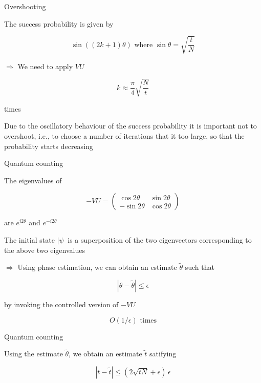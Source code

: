 
\begin{frame}{Overshooting}

The success probability is given by

\[
\sin((2k + 1)\theta) \mbox{ where } \sin\theta = \sqrt{\frac{t}{N}}
\]

\bigskip
$\Rightarrow$ We need to apply $VU$

\[
k \approx \frac{\pi}{4} \sqrt{\frac{N}{t}}
\]

times

\bigskip
Due to the oscillatory behaviour of the success probability it is important not to overshoot, i.e., to choose a number of iterations that it too large, so that the probability starts decreasing
\end{frame}


\begin{frame}{Quantum counting}

The eigenvalues of 

\[
- V U = \begin{pmatrix} \cos2\theta   & \sin2\theta \\
                              - \sin2\theta & \cos2\theta
              \end{pmatrix}
\]


are $e^{i 2\theta}$ and $e^{-i 2\theta}$

\bigskip
The initial state $|\psi\>$ is a superposition of the two eigenvectors corresponding to the above two eigenvalues

\bigskip
$\Rightarrow$ Using phase estimation, we can obtain an estimate $\tilde{\theta}$ such that

\[
|\theta - \tilde{\theta} | \le \epsilon
\]

\bigskip
by invoking the controlled version of $-VU$ 

\[
O(1/\epsilon) \mbox{ times}
\]

\end{frame}


\begin{frame}{Quantum counting}

Using the estimate $\tilde{\theta}$, we obtain an estimate $\tilde{t}$ satifying

\[
|t - \tilde{t} | \le (2\sqrt{t N} + \epsilon) \, \epsilon
\]

\end{frame}

